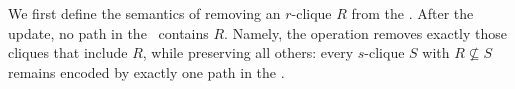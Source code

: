 We first define the semantics of removing an $r$-clique $R$ from the \cpi. 
After the update, no path in the \cpi\ contains $R$. 
Namely, the operation removes exactly those cliques that include $R$, while preserving all others:
every $s$-clique $S$ with $R\nsubseteq S$ remains encoded by exactly one path in the \cpi.














